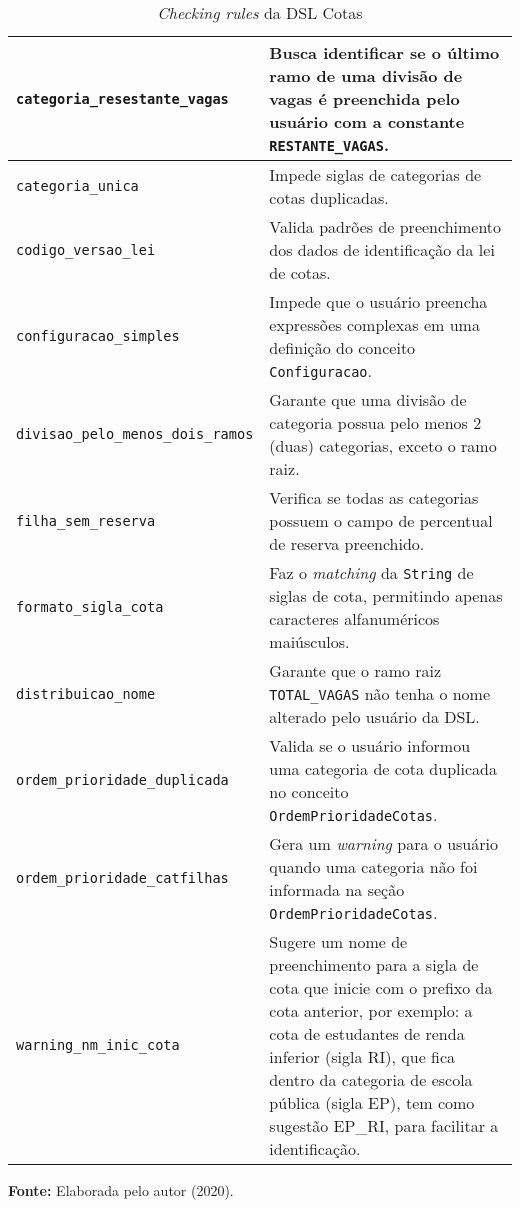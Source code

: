 \begin{table}[ht]
\caption{\textit{Checking rules} da DSL Cotas}
\label{tblcheckingrules}
\centering

\begin{tabular}{|p{6cm}|p{9cm}|}
\hline
\texttt{categoria\_resestante\_vagas} & Busca identificar se o último ramo de uma divisão de vagas é preenchida pelo usuário com a constante \texttt{RESTANTE\_VAGAS}.                                                                                      \\ \hline
\texttt{categoria\_unica} & Impede siglas de categorias de cotas duplicadas.                         \\ \hline
\texttt{codigo\_versao\_lei}          & Valida padrões de preenchimento dos dados de identificação da lei de cotas.                                       \\ \hline
\texttt{configuracao\_simples}          & Impede que o usuário preencha expressões complexas em uma definição do conceito \texttt{Configuracao}.
                        \\ \hline
\texttt{divisao\_pelo\_menos\_dois\_ramos}          & Garante que uma divisão de categoria possua pelo menos 2 (duas) categorias, exceto o ramo raiz.
                        \\ \hline
\texttt{filha\_sem\_reserva}          & Verifica se todas as categorias possuem o campo de percentual de reserva preenchido.

\\ \hline
               
\texttt{formato\_sigla\_cota}          & Faz o \textit{matching} da \texttt{String} de siglas de cota, permitindo apenas caracteres alfanuméricos maiúsculos.
\\ \hline

\texttt{distribuicao\_nome}          & Garante que o ramo raiz \texttt{TOTAL\_VAGAS} não tenha o nome alterado pelo usuário da DSL.
\\ \hline

\texttt{ordem\_prioridade\_duplicada}          & Valida se o usuário informou uma categoria de cota duplicada no conceito \texttt{OrdemPrioridadeCotas}.
\\ \hline

\texttt{ordem\_prioridade\_catfilhas}          & Gera um \textit{warning} para o usuário quando uma categoria não foi informada na seção \texttt{OrdemPrioridadeCotas}.
\\ \hline

\texttt{warning\_nm\_inic\_cota}          & Sugere um nome de preenchimento para a sigla de cota que inicie com o prefixo da cota anterior, por exemplo: a cota de estudantes de renda inferior (sigla RI), que fica dentro da categoria de escola pública (sigla EP), tem como sugestão EP\_RI, para facilitar a identificação.
\\ \hline

\end{tabular}

  \par\medskip\textbf{Fonte:} Elaborada pelo autor (2020). \par\medskip
\end{table}
